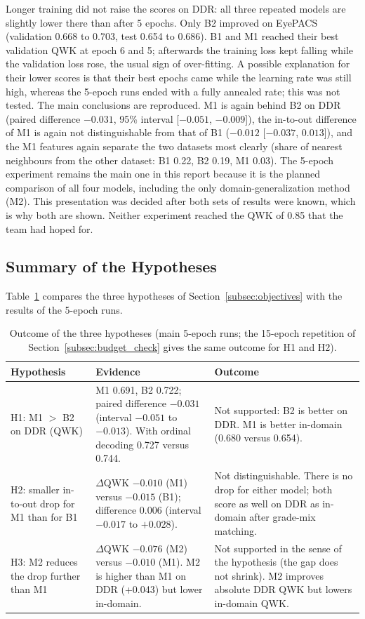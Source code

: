 Longer training did not raise the scores on DDR: all three repeated models are slightly lower there than after 5 epochs. Only B2 improved on EyePACS (validation 0.668 to 0.703, test 0.654 to 0.686). B1 and M1 reached their best validation QWK at epoch 6 and 5; afterwards the training loss kept falling while the validation loss rose, the usual sign of over-fitting. A possible explanation for their lower scores is that their best epochs came while the learning rate was still high, whereas the 5-epoch runs ended with a fully annealed rate; this was not tested. The main conclusions are reproduced. M1 is again behind B2 on DDR (paired difference $-0.031$, 95\% interval [$-0.051$, $-0.009$]), the in-to-out difference of M1 is again not distinguishable from that of B1 ($-0.012$ [$-0.037$, $0.013$]), and the M1 features again separate the two datasets most clearly (share of nearest neighbours from the other dataset: B1 0.22, B2 0.19, M1 0.03). The 5-epoch experiment remains the main one in this report because it is the planned comparison of all four models, including the only domain-generalization method (M2). This presentation was decided after both sets of results were known, which is why both are shown. Neither experiment reached the QWK of 0.85 that the team had hoped for.

\subsection{Summary of the Hypotheses}
\label{subsec:hypotheses_summary}

Table~\ref{tab:hypotheses} compares the three hypotheses of Section~\ref{subsec:objectives} with the results of the 5-epoch runs.

\begin{table}[htbp]
    \centering
    \caption{Outcome of the three hypotheses (main 5-epoch runs; the 15-epoch repetition of Section~\ref{subsec:budget_check} gives the same outcome for H1 and H2).}
    \label{tab:hypotheses}
    \small
    \begin{tabularx}{\textwidth}{l X X}
        \toprule
        \textbf{Hypothesis} & \textbf{Evidence} & \textbf{Outcome} \\
        \midrule
        H1: M1 $>$ B2 on DDR (QWK) & M1 0.691, B2 0.722; paired difference $-0.031$ (interval $-0.051$ to $-0.013$). With ordinal decoding 0.727 versus 0.744. & Not supported: B2 is better on DDR. M1 is better in-domain (0.680 versus 0.654). \\
        H2: smaller in-to-out drop for M1 than for B1 & $\Delta$QWK $-0.010$ (M1) versus $-0.015$ (B1); difference 0.006 (interval $-0.017$ to $+0.028$). & Not distinguishable. There is no drop for either model; both score as well on DDR as in-domain after grade-mix matching. \\
        H3: M2 reduces the drop further than M1 & $\Delta$QWK $-0.076$ (M2) versus $-0.010$ (M1). M2 is higher than M1 on DDR (+0.043) but lower in-domain. & Not supported in the sense of the hypothesis (the gap does not shrink). M2 improves absolute DDR QWK but lowers in-domain QWK. \\
        \bottomrule
    \end{tabularx}
\end{table}

